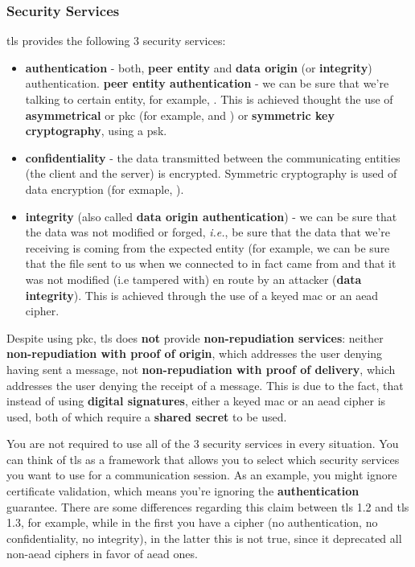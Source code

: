 \documentclass{llncs}
\begin{document}
\subsubsection{Security Services}
%
\gls{tls} provides the following 3 security services:
\begin{itemize}
\item \textbf{authentication} - both, \textbf{peer entity} and \textbf{data origin} (or \textbf{integrity})
authentication.
\subitem \textbf{peer entity authentication} - we can be sure that we’re talking to certain entity, for example, .
This is achieved thought the use of \textbf{asymmetrical} or \gls{pkc} (for example,  and )
or \textbf{symmetric key cryptography}, using a \gls{psk}.
\item \textbf{confidentiality} - the data transmitted between the communicating
entities (the client and the server) is encrypted. Symmetric cryptography is
used of data encryption (for exmaple, ).
\item \textbf{integrity} (also called \textbf{data origin authentication}) - we can be sure that the data was not modified or forged,
\textit{i.e.}, be sure that the data that we’re receiving is coming from the expected entity (for example, we can be sure
that the  file sent to us when we connected to  in fact
came from  and that it was not modified (i.e tampered with) en
route by an attacker (\textbf{data integrity}). This is achieved through the use
of a keyed \gls{mac} or an \gls{aead} cipher.
\end{itemize}

Despite using \gls{pkc}, \gls{tls} does \textbf{not} provide \textbf{non-repudiation services}:
neither \textbf{non-repudiation with proof of origin}, which addresses the user denying
having sent a message, not \textbf{non-repudiation with proof of delivery}, which
addresses the user denying the receipt of a message. This is due to the fact, that
instead of using \textbf{digital signatures}, either a keyed \gls{mac} or an \gls{aead}
cipher is used, both of which require a \textbf{shared secret} to be used.

You are not required to use all of the 3 security services in every situation.
You can think of \gls{tls} as a framework that allows you to select which security
services you want to use for a communication session. As an example, you might
ignore certificate validation, which means you're ignoring the \textbf{authentication}
guarantee. There are some differences regarding this claim between \gls{tls} 1.2
and \gls{tls} 1.3, for example, while in the first you have a 
cipher (no authentication, no confidentiality, no integrity), in the latter
this is not true, since it deprecated all non-\gls{aead} ciphers in favor of
\gls{aead} ones.
\end{document}
